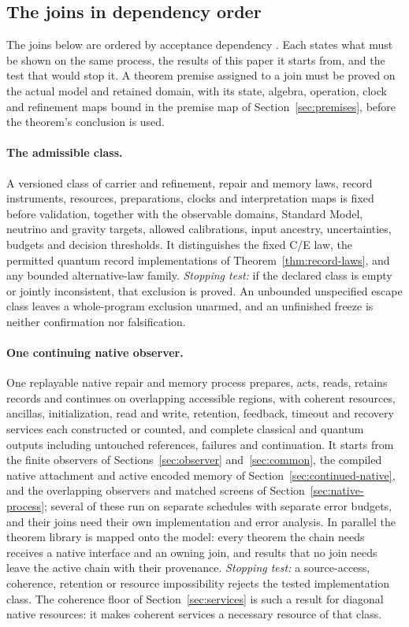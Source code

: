 \documentclass[11pt]{article}
\theoremstyle{definition}
\theoremstyle{remark}
\theoremstyle{plain}
\begin{document}
\subsection{The joins in dependency order}
\label{sec:join-order}

The joins below are ordered by acceptance dependency \cite{completionProgram}.
Each states what must be shown on the same process, the results of this paper
it starts from, and the test that would stop it. A theorem premise assigned
to a join must be proved on the actual model and retained domain, with its
state, algebra, operation, clock and refinement maps bound in the premise map
of Section~\ref{sec:premises}, before the theorem's conclusion is used.

\paragraph{The admissible class.} A versioned class of carrier and
refinement, repair and memory laws, record instruments, resources,
preparations, clocks and interpretation maps is fixed before validation,
together with the observable domains, Standard Model, neutrino and gravity
targets, allowed calibrations, input ancestry, uncertainties, budgets and
decision thresholds. It distinguishes the fixed C/E law, the permitted
quantum record implementations of Theorem~\ref{thm:record-laws}, and any
bounded alternative-law family. \emph{Stopping test:} if the declared class is
empty or jointly inconsistent, that exclusion is proved. An unbounded
unspecified escape class leaves a whole-program exclusion unarmed, and an
unfinished freeze is neither confirmation nor falsification.

\paragraph{One continuing native observer.} One replayable native repair and
memory process prepares, acts, reads, retains records and continues on
overlapping accessible regions, with coherent resources, ancillas,
initialization, read and write, retention, feedback, timeout and recovery
services each constructed or counted, and complete classical and quantum
outputs including untouched references, failures and continuation. It
starts from the finite observers of Sections~\ref{sec:observer}
and~\ref{sec:common}, the compiled native attachment and active encoded
memory of Section~\ref{sec:continued-native}, and the overlapping observers
and matched screens of Section~\ref{sec:native-process}; several of these run
on separate schedules with separate error budgets, and their joins need
their own implementation and error analysis. In parallel the theorem
library is mapped onto the model: every theorem the chain needs receives a
native interface and an owning join, and results that no join needs leave
the active chain with their provenance. \emph{Stopping test:} a
source-access, coherence, retention or resource impossibility rejects the
tested implementation class. The coherence floor of
Section~\ref{sec:services} is such a result for diagonal native resources: it
makes coherent services a necessary resource of that class.
\end{document}
